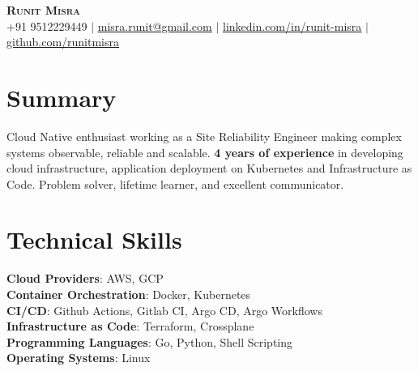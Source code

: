 \documentclass[letterpaper,11pt]{article}
\begin{document}

\begin{center}
    \textbf{\Huge \scshape Runit Misra} \\ \vspace{1pt}
    \small +91 9512229449 $|$ \href{mailto:misra.runit@gmail.com}{\underline{misra.runit@gmail.com}} $|$ 
    \href{https://linkedin.com/in/runit-misra}{\underline{linkedin.com/in/runit-misra}} $|$
    \href{https://github.com/runitmisra}{\underline{github.com/runitmisra}}
\end{center}

%
\section{Summary}
 \begin{itemize}[leftmargin=0.15in, label={}]
    \small{\item{Cloud Native enthusiast working as a Site Reliability Engineer making complex systems observable, reliable and scalable. \textbf{4 years of experience} in developing cloud infrastructure, application deployment on Kubernetes and Infrastructure as Code. Problem solver, lifetime learner, and excellent communicator.}}
 \end{itemize}

%
\section{Technical Skills}
 \begin{itemize}[leftmargin=0.15in, label={}]
    \small{\item{
     \textbf{Cloud Providers}{: AWS, GCP} \\
     \textbf{Container Orchestration}{: Docker, Kubernetes} \\
     \textbf{CI/CD}{: Github Actions, Gitlab CI, Argo CD, Argo Workflows} \\
     \textbf{Infrastructure as Code}{: Terraform, Crossplane} \\
     \textbf{Programming Languages}{: Go, Python, Shell Scripting} \\
     \textbf{Operating Systems}{: Linux}
    }}
 \end{itemize}
\end{document}
